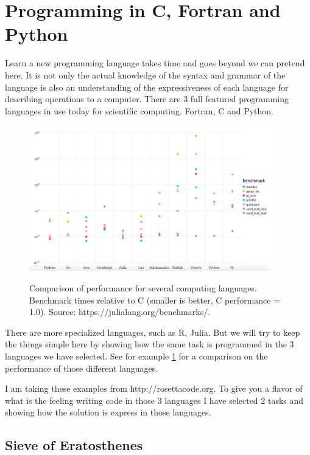 \section{Programming in C, Fortran and Python}

Learn a new programming language takes time and goes beyond we can pretend here. It is not only the actual knowledge of the syntax and grammar of the language is also an understanding of the expressiveness of each language for describing operations to a computer. There are 3 full featured programming languages in use today for scientific computing. Fortran, C and Python. 

\begin{figure}
\includegraphics[width=0.95\textwidth]{images/julia_benchmark.png}
\label{bench}
\caption{Comparison of performance for several computing languages. Benchmark times relative to C (smaller is better, C performance = 1.0). Source: https://julialang.org/benchmarks/.}
\end{figure}


There are more specialized languages, such as R, Julia. But we will try to keep the things simple here by showing how the same task is programmed in the 3 languages we have selected.
See for example \ref{bench} for a comparison on the performance of those different languages.

I am taking these examples from http://rosettacode.org.
To give you a flavor of what is the feeling writing code in those 3 languages I have selected 2 tasks and showing how the solution is express in those languages.

\subsection{Sieve of Eratosthenes}

